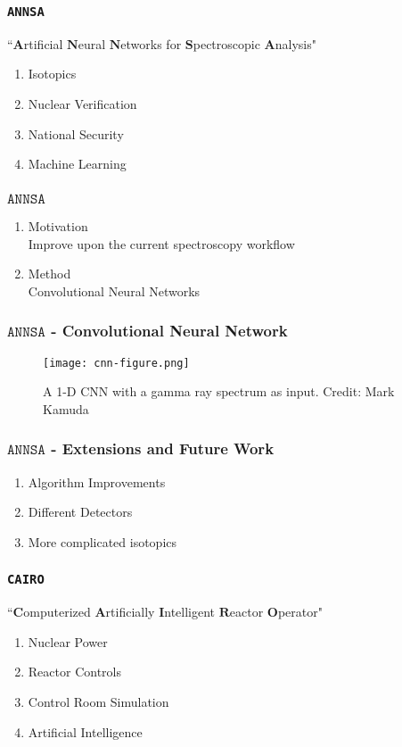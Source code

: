 \graphicspath{{./images/}}

	\begin{frame}
		\frametitle{\texttt{ANNSA}}
		``$\textbf{A}$rtificial $\textbf{N}$eural $\textbf{N}$etworks for $\textbf{S}$pectroscopic $\textbf{A}$nalysis"\\
		\begin{enumerate}
			\item Isotopics
			\item Nuclear Verification
			\item National Security 
			\item Machine Learning
		\end{enumerate}
	\end{frame}	
	\begin{frame}
		\frametitle{$\texttt{ANNSA}$}
		\begin{enumerate}
			\item Motivation\\
			Improve upon the current spectroscopy workflow
			\item Method\\
			Convolutional Neural Networks
		\end{enumerate} 
	\end{frame}
	\begin{frame}
		\frametitle{$\texttt{ANNSA}$ - Convolutional Neural Network}
		\begin{figure}
			\texttt{[image: cnn-figure.png]}
			\caption{A 1-D CNN with a gamma ray spectrum as input. Credit: Mark Kamuda}
		\end{figure}
	\end{frame}

	\begin{frame}
		\frametitle{$\texttt{ANNSA}$ - Extensions and Future Work}
		\begin{enumerate}
			\item Algorithm Improvements
			\item Different Detectors
			\item More complicated isotopics
		\end{enumerate}
	\end{frame}


	\begin{frame}
		\frametitle{\texttt{CAIRO}}
		``$\textbf{C}$omputerized $\textbf{A}$rtificially $\textbf{I}$ntelligent $\textbf{R}$eactor $\textbf{O}$perator"\\
		\begin{enumerate}
			\item Nuclear Power
			\item Reactor Controls
			\item Control Room Simulation
			\item Artificial Intelligence
		\end{enumerate}
	\end{frame}

